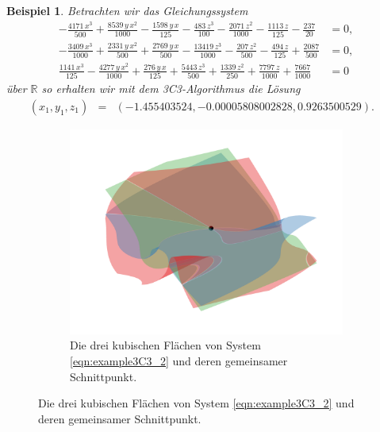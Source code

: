\documentclass[a4paper,oneside, 11pt, openany%
]{article}
\newcommand{\R}{{\mathbb R}}
\theoremstyle{custom}
\theoremstyle{custom}
\newtheorem{example}{Beispiel}[section]
\begin{document}
\begin{example}\label{ex:3C3_2}
	Betrachten wir das Gleichungssystem
	\begin{equation}\label{eqn:example3C3_2}
		\begin{alignedat}{1}
-\frac{4171\,x^3}{500}+\frac{8539\,y\,x^2}{1000}-\frac{1598\,y\,x}{125}-\frac{483\,z^3}{100}-\frac{2071\,z^2}{1000}-\frac{1113\,z}{125}-\frac{237}{20}&=0,\\ -\frac{3409\,x^3}{1000}+\frac{2331\,y\,x^2}{500}+\frac{2769\,y\,x}{500}-\frac{13419\,z^3}{1000}-\frac{207\,z^2}{500}-\frac{494\,z}{125}+\frac{2087}{500}&=0,\\ \frac{1141\,x^3}{125}-\frac{4277\,y\,x^2}{1000}+\frac{276\,y\,x}{125}+\frac{5443\,z^3}{500}+\frac{1339\,z^2}{250}+\frac{7797\,z}{1000}+\frac{7667}{1000}&=0
		\end{alignedat}
	\end{equation}
	über $\R$ so erhalten wir mit dem 3C3-Algorithmus die Lösung
	\begin{equation*}
		\begin{alignedat}{5}
			&\left( x_{1},y_{1},z_{1}\right) &=& \left(-1.455403524, -0.00005808002828, 0.9263500529 \right).&&
		\end{alignedat}
	\end{equation*}
\end{example}
\begin{figure}[H]
	\begin{subfigure}[b]{0.8\textwidth}
	\includegraphics[width=\textwidth]{"images/e3c3_example2.png"}
	\caption{Die drei kubischen Flächen von System \eqref{eqn:example3C3_2} und deren gemeinsamer Schnittpunkt.}
\end{subfigure}
\end{figure}
\end{document}
